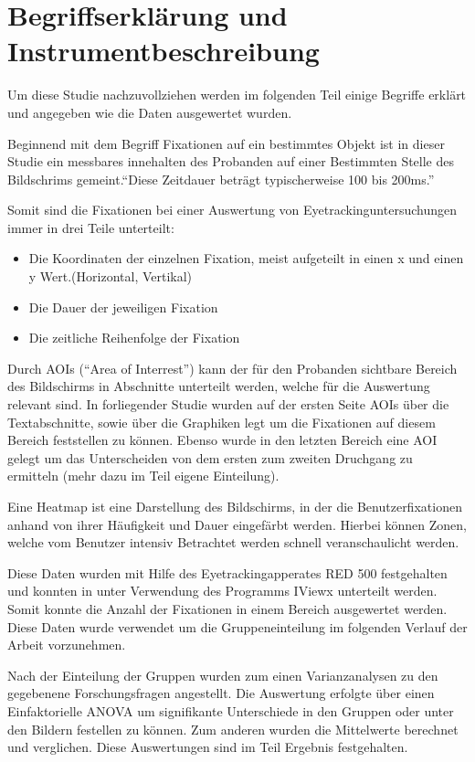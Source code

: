 \section{Begriffserklärung und Instrumentbeschreibung}
Um diese Studie nachzuvollziehen werden im folgenden Teil einige Begriffe erklärt und angegeben wie die Daten ausgewertet wurden. 

Beginnend mit dem Begriff Fixationen auf ein bestimmtes Objekt ist in dieser Studie ein messbares innehalten des Probanden auf einer Bestimmten Stelle des Bildschrims gemeint.``Diese Zeitdauer beträgt typischerweise 100 bis 200ms.'' %

Somit sind die Fixationen bei einer Auswertung von Eyetrackinguntersuchungen immer in drei Teile unterteilt:
    \begin{itemize}
        \item Die Koordinaten der einzelnen Fixation, meist aufgeteilt in einen x und einen y Wert.(Horizontal, Vertikal)
        \item Die Dauer der jeweiligen Fixation
        \item Die zeitliche Reihenfolge der Fixation
    \end{itemize}

Durch AOIs (``Area of Interrest'') kann der für den Probanden sichtbare Bereich des Bildschirms in Abschnitte unterteilt werden, welche für die Auswertung relevant sind. In forliegender Studie wurden auf der ersten Seite AOIs über die Textabschnitte, sowie über die Graphiken legt um die Fixationen auf diesem Bereich feststellen zu können. Ebenso wurde in den letzten Bereich eine AOI gelegt um das Unterscheiden von dem ersten zum zweiten Druchgang zu ermitteln (mehr dazu im Teil eigene Einteilung).

Eine Heatmap ist eine Darstellung des Bildschirms, in der die Benutzerfixationen anhand von ihrer Häufigkeit und Dauer eingefärbt werden. Hierbei können Zonen, welche vom Benutzer intensiv Betrachtet werden schnell veranschaulicht werden.

Diese Daten wurden mit Hilfe des Eyetrackingapperates RED 500 festgehalten und konnten in unter Verwendung des Programms IViewx unterteilt werden. Somit konnte die Anzahl der Fixationen in einem Bereich ausgewertet werden. Diese Daten wurde verwendet um die Gruppeneinteilung im folgenden Verlauf der Arbeit vorzunehmen.

Nach der Einteilung der Gruppen wurden zum einen Varianzanalysen zu den gegebenene Forschungsfragen angestellt. Die Auswertung erfolgte über einen Einfaktorielle ANOVA um signifikante Unterschiede in den Gruppen oder unter den Bildern festellen zu können. Zum anderen wurden die Mittelwerte berechnet und verglichen. Diese Auswertungen sind im Teil Ergebnis festgehalten.


